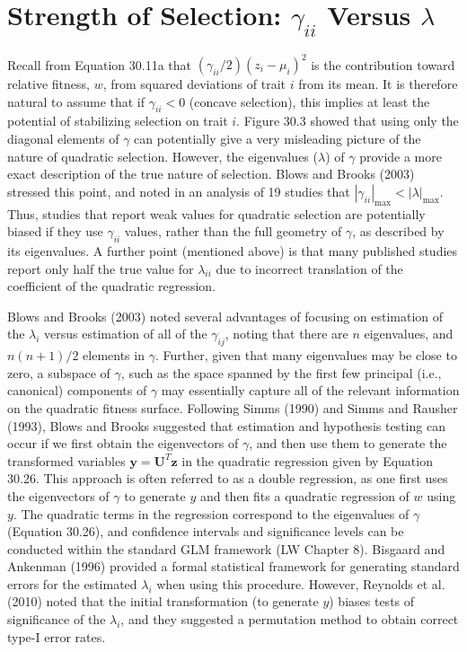 \documentclass{article}
\begin{document}
\section{Strength of Selection:  $ \gamma_{ii} $ Versus  $ \lambda $}
Recall from Equation 30.11a that $(\gamma_{ii}/2)(z_i - \mu_i)^2$ is the contribution toward relative fitness, $w$, from squared deviations of trait $i$ from its mean. It is therefore natural to assume that if $\gamma_{ii} < 0$ (concave selection), this implies at least the potential of stabilizing selection on trait $i$. Figure 30.3 showed that using only the diagonal elements of $\gamma$ can potentially give a very misleading picture of the nature of quadratic selection. However, the eigenvalues ($\lambda$) of $\gamma$ provide a more exact description of the true nature of selection. Blows and Brooks (2003) stressed this point, and noted in an analysis of 19 studies that $|\gamma_{ii}|_{\max} < |\lambda|_{\max}$. Thus, studies that report weak values for quadratic selection are potentially biased if they use $\gamma_{ii}$ values, rather than the full geometry of $\gamma$, as described by its eigenvalues. A further point (mentioned above) is that many published studies report only half the true value for $\lambda_{ii}$ due to incorrect translation of the coefficient of the quadratic regression.

Blows and Brooks (2003) noted several advantages of focusing on estimation of the  $ \lambda_i $ versus estimation of all of the  $ \gamma_{ij} $, noting that there are  $ n $ eigenvalues, and  $ n(n + 1)/2 $ elements in  $ \gamma $. Further, given that many eigenvalues may be close to zero, a subspace of  $ \gamma $, such as the space spanned by the first few principal (i.e., canonical) components of  $ \gamma $ may essentially capture all of the relevant information on the quadratic fitness surface. Following Simms (1990) and Simms and Rausher (1993), Blows and Brooks suggested that estimation and hypothesis testing can occur if we first obtain the eigenvectors of  $ \gamma $, and then use them to generate the transformed variables  $ \mathbf{y} = \mathbf{U}^T \mathbf{z} $ in the quadratic regression given by Equation 30.26. This approach is often referred to as a double regression, as one first uses the eigenvectors of  $ \gamma $ to generate  $ y $ and then fits a quadratic regression of  $ w $ using  $ y $. The quadratic terms in the regression correspond to the eigenvalues of  $ \gamma $ (Equation 30.26), and confidence intervals and significance levels can be conducted within the standard GLM framework (LW Chapter 8). Bisgaard and Ankenman (1996) provided a formal statistical framework for generating standard errors for the estimated  $ \lambda_i $ when using this procedure. However, Reynolds et al. (2010) noted that the initial transformation (to generate  $ y $) biases tests of significance of the  $ \lambda_i $, and they suggested a permutation method to obtain correct type-I error rates.
\end{document}
